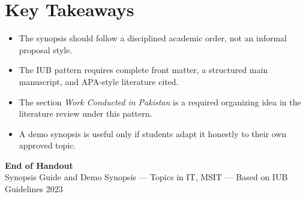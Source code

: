 \documentclass[11pt,a4paper]{article}
\begin{document}
\section{Key Takeaways}

\begin{itemize}[leftmargin=*]
  \item The synopsis should follow a disciplined academic order, not an informal proposal style.
  \item The IUB pattern requires complete front matter, a structured main manuscript, and APA-style literature cited.
  \item The section \emph{Work Conducted in Pakistan} is a required organizing idea in the literature review under this pattern.
  \item A demo synopsis is useful only if students adapt it honestly to their own approved topic.
\end{itemize}

\vfill
\begin{center}
{\large\textcolor{primary}{\textbf{End of Handout}}}\\[4pt]
{\small\textcolor{gray!70!black}{Synopsis Guide and Demo Synopsis --- Topics in IT, MSIT --- Based on IUB Guidelines 2023}}
\end{center}
\end{document}

